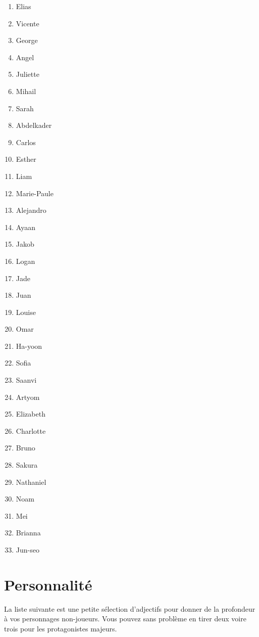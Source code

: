 \documentclass[a5paper,pagesize,10pt,bibliography=totoc,numbers=enddot,
headings=normal,DIV=9,twoside=false,tablecaptionabove]{scrbook}
\begin{document}
\begin{multicols}{3}
\begin{enumerate}
	\item Elias
	\item Vicente
	\item George
	\item Angel
	\item Juliette
	\item Mihail
	\item Sarah
	\item Abdelkader
	\item Carlos
	\item Esther
	\item Liam
	\item Marie-Paule
	\item Alejandro
	\item Ayaan
	\item Jakob
	\item Logan
	\item Jade
	\item Juan
	\item Louise
	\item Omar
	\item Ha-yoon
	\item Sofia
	\item Saanvi
	\item Artyom
	\item Elizabeth
	\item Charlotte
	\item Bruno
	\item Sakura
	\item Nathaniel
	\item Noam
	\item Mei
	\item Brianna
	\item Jun-seo
\end{enumerate}
\end{multicols}

\section{Personnalité}

La liste suivante est une petite sélection d'adjectifs pour donner de la profondeur à vos personnages non-joueurs. Vous pouvez sans problème en tirer deux voire trois pour les protagonistes majeurs.
\end{document}
